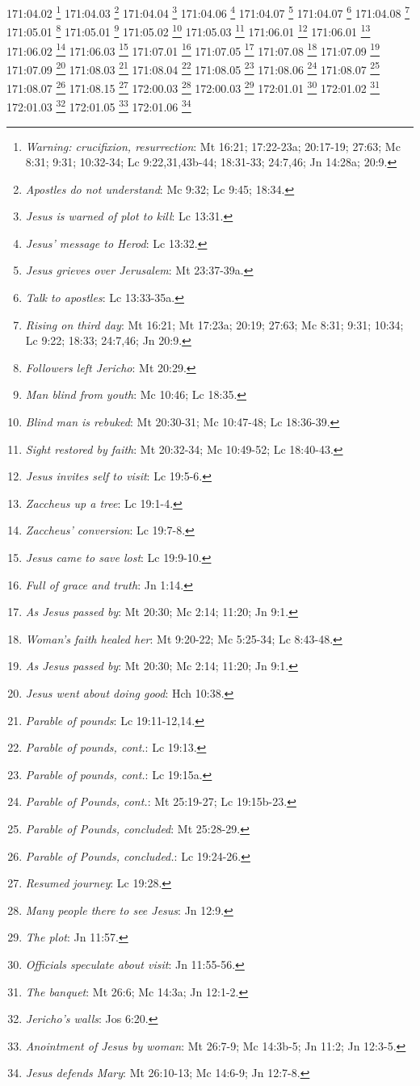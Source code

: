 171:04.02 \footnote{\textit{Warning: crucifixion, resurrection}: Mt 16:21; 17:22-23a; 20:17-19; 27:63; Mc 8:31; 9:31; 10:32-34; Lc 9:22,31,43b-44; 18:31-33; 24:7,46; Jn 14:28a; 20:9.}
171:04.03 \footnote{\textit{Apostles do not understand}: Mc 9:32; Lc 9:45; 18:34.}
171:04.04 \footnote{\textit{Jesus is warned of plot to kill}: Lc 13:31.}
171:04.06 \footnote{\textit{Jesus' message to Herod}: Lc 13:32.}
171:04.07 \footnote{\textit{Jesus grieves over Jerusalem}: Mt 23:37-39a.}
171:04.07 \footnote{\textit{Talk to apostles}: Lc 13:33-35a.}
171:04.08 \footnote{\textit{Rising on third day}: Mt 16:21; Mt 17:23a; 20:19; 27:63; Mc 8:31; 9:31; 10:34; Lc 9:22; 18:33; 24:7,46; Jn 20:9.}
171:05.01 \footnote{\textit{Followers left Jericho}: Mt 20:29.}
171:05.01 \footnote{\textit{Man blind from youth}: Mc 10:46; Lc 18:35.}
171:05.02 \footnote{\textit{Blind man is rebuked}: Mt 20:30-31; Mc 10:47-48; Lc 18:36-39.}
171:05.03 \footnote{\textit{Sight restored by faith}: Mt 20:32-34; Mc 10:49-52; Lc 18:40-43.}
171:06.01 \footnote{\textit{Jesus invites self to visit}: Lc 19:5-6.}
171:06.01 \footnote{\textit{Zaccheus up a tree}: Lc 19:1-4.}
171:06.02 \footnote{\textit{Zaccheus' conversion}: Lc 19:7-8.}
171:06.03 \footnote{\textit{Jesus came to save lost}: Lc 19:9-10.}
171:07.01 \footnote{\textit{Full of grace and truth}: Jn 1:14.}
171:07.05 \footnote{\textit{As Jesus passed by}: Mt 20:30; Mc 2:14; 11:20; Jn 9:1.}
171:07.08 \footnote{\textit{Woman's faith healed her}: Mt 9:20-22; Mc 5:25-34; Lc 8:43-48.}
171:07.09 \footnote{\textit{As Jesus passed by}: Mt 20:30; Mc 2:14; 11:20; Jn 9:1.}
171:07.09 \footnote{\textit{Jesus went about doing good}: Hch 10:38.}
171:08.03 \footnote{\textit{Parable of pounds}: Lc 19:11-12,14.}
171:08.04 \footnote{\textit{Parable of pounds, cont.}: Lc 19:13.}
171:08.05 \footnote{\textit{Parable of pounds, cont.}: Lc 19:15a.}
171:08.06 \footnote{\textit{Parable of Pounds, cont.}: Mt 25:19-27; Lc 19:15b-23.}
171:08.07 \footnote{\textit{Parable of Pounds, concluded}: Mt 25:28-29.}
171:08.07 \footnote{\textit{Parable of Pounds, concluded.}: Lc 19:24-26.}
171:08.15 \footnote{\textit{Resumed journey}: Lc 19:28.}
172:00.03 \footnote{\textit{Many people there to see Jesus}: Jn 12:9.}
172:00.03 \footnote{\textit{The plot}: Jn 11:57.}
172:01.01 \footnote{\textit{Officials speculate about visit}: Jn 11:55-56.}
172:01.02 \footnote{\textit{The banquet}: Mt 26:6; Mc 14:3a; Jn 12:1-2.}
172:01.03 \footnote{\textit{Jericho's walls}: Jos 6:20.}
172:01.05 \footnote{\textit{Anointment of Jesus by woman}: Mt 26:7-9; Mc 14:3b-5; Jn 11:2; Jn 12:3-5.}
172:01.06 \footnote{\textit{Jesus defends Mary}: Mt 26:10-13; Mc 14:6-9; Jn 12:7-8.}
